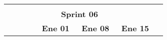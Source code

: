 \begin{longtable}[c]{llclllllllllllllllll}
        \multicolumn{1}{|l|}{}                                                                                                  & \multicolumn{1}{l|}{}                                                          & \multicolumn{1}{l|}{}                                                            & \multicolumn{1}{l|}{}                                                                &                                 &                                 &                                 &                                 &                                 &                                 &                                 &                                 &                                 &                                 &                                 &                                 &                                 &                                 & \multicolumn{1}{l|}{}                         &  \\ \cline{1-19}
        \multicolumn{19}{|c|}{\cellcolor[HTML]{8EA9D8}\textbf{Sprint 06}}                                                                                                                                                                                                                                                                                                                                                                                                                                                                                                                                                                                                                                                                                                                                                                                                                                                              &  \\ \cline{1-19}
        \multicolumn{1}{|c|}{}                                                                                                  & \multicolumn{1}{c|}{}                                                          & \multicolumn{1}{c|}{}                                                            & \multicolumn{1}{c|}{}                                                                & \multicolumn{5}{c|}{\textbf{Ene 01}}                                                                                                                                    & \multicolumn{5}{c|}{\textbf{Ene 08}}                                                                                                                                    & \multicolumn{5}{c|}{\textbf{Ene 15}}                                                                                                                                                  &  \\ \cline{5-19}

\end{longtable}
